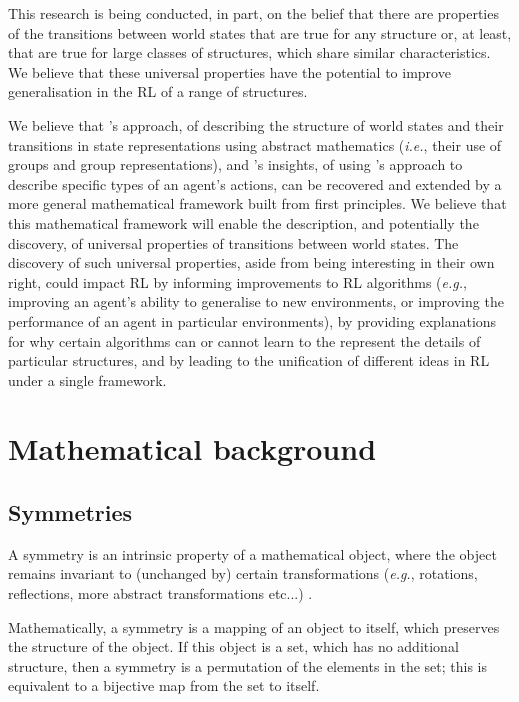 This research is being conducted, in part, on the belief that there are properties of the transitions between world states that are true for any structure or, at least, that are true for large classes of structures, which share similar characteristics.
We believe that these universal properties have the potential to improve generalisation in the RL of a range of structures.

We believe that \autocite{Higgins2018}'s approach, of describing the structure of world states and their transitions in state representations using abstract mathematics (\textit{i.e.}, their use of groups and group representations), and \autocite{caselles2019symmetry}'s insights, of using \autocite{Higgins2018}'s approach to describe specific types of an agent's actions, can be recovered and extended by a more general mathematical framework built from first principles.
We believe that this mathematical framework will enable the description, and potentially the discovery, of universal properties of transitions between world states.
The discovery of such universal properties, aside from being interesting in their own right, could impact RL by informing improvements to RL algorithms (\textit{e.g.}, improving an agent's ability to generalise to new environments, or improving the performance of an agent in particular environments), by providing explanations for why certain algorithms can or cannot learn to the represent the details of particular structures, and by leading to the unification of different ideas in RL under a single framework.


\section{Mathematical background}\label{sec:Mathematical background}

\subsection{Symmetries}

A symmetry is an intrinsic property of a mathematical object, where the object remains invariant to (unchanged by) certain transformations (\textit{e.g.}, rotations, reflections, more abstract transformations etc...) \autocite{Mathworld-group-theory}.

Mathematically, a symmetry is a mapping of an object to itself, which preserves the structure of the object.
If this object is a set, which has no additional structure, then a symmetry is a permutation of the elements in the set; this is equivalent to a bijective map from the set to itself.

